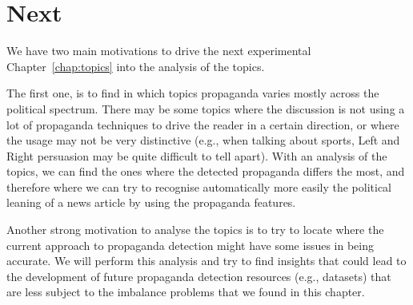 \section{\statusgreen Next}
\label{sec:ps_next}

We have two main motivations to drive the next experimental Chapter~\ref{chap:topics} into the analysis of the topics.

The first one, is to find in which topics propaganda varies mostly across the political spectrum. There may be some topics where the discussion is not using a lot of propaganda techniques to drive the reader in a certain direction, or where the usage may not be very distinctive (e.g., when talking about sports, Left and Right persuasion may be quite difficult to tell apart).
With an analysis of the topics, we can find the ones where the detected propaganda differs the most, and therefore where we can try to recognise automatically more easily the political leaning of a news article by using the propaganda features.

Another strong motivation to analyse the topics is to try to locate where the current approach to propaganda detection might have some issues in being accurate.
We will perform this analysis and try to find insights that could lead to the development of future propaganda detection resources (e.g., datasets) that are less subject to the imbalance problems that we found in this chapter.



